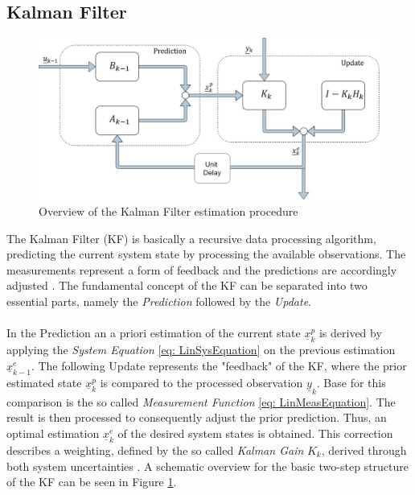 \documentclass[english]{isasthesis}
\begin{document}
	\subsection{Kalman Filter}
	\begin{figure}[t]
                \centering
                \includegraphics[width=1\textwidth]{figures/KF.jpg}
                \caption{Overview of the Kalman Filter estimation procedure}
                \label{fig:KF}
     \end{figure}
	The Kalman Filter (KF) is basically a recursive data processing algorithm, predicting the current system state by processing the available observations. The measurements represent a form of feedback and the predictions are accordingly adjusted  \cite{maybeck1982stochastic}. The fundamental concept of the KF can be separated into two essential parts, namely the \textit{Prediction} followed by the \textit{Update}. \\ \\
	In the Prediction an a priori estimation of the current state $\underline{x}_k^p$ is derived by applying the \textit{System Equation} \eqref{eq: LinSysEquation} on the previous estimation $\underline{x}_{k-1}^e$. The following Update represents the "feedback" of the KF, where the prior estimated state $\underline{x}_k^p$ is compared to the processed observation $\underline{y}_k$. Base for this comparison is the so called \textit{Measurement Function} \eqref{eq: LinMeasEquation}. The result is then processed to consequently adjust the  prior prediction. Thus, an optimal estimation $\underline{x}_k^e$ of the desired system states is obtained. This correction describes a weighting, defined by the so called \textit{Kalman Gain} $K_k$, derived through both system uncertainties \cite{mariana}. A schematic overview for the basic two-step structure of the KF can be seen in Figure \ref{fig:KF}. \\ \\
\end{document}
